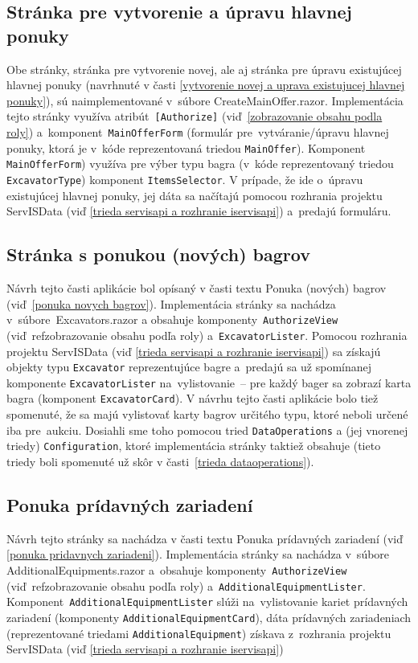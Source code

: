 \subsection{Stránka pre vytvorenie a úpravu hlavnej ponuky}

Obe stránky, stránka pre vytvorenie novej, ale aj stránka pre úpravu existujúcej hlavnej ponuky (navrhnuté v časti \ref{vytvorenie novej a uprava existujucej hlavnej ponuky}), sú naimplementované v~súbore CreateMainOffer.razor. Implementácia tejto stránky využíva atribút~\verb|[Authorize]| (viď~\ref{zobrazovanie obsahu podla roly}) a~komponent~\verb|MainOfferForm| (formulár pre~vytváranie/úpravu hlavnej ponuky, ktorá je v~kóde reprezentovaná triedou \verb|MainOffer|). Komponent \verb|MainOfferForm|) využíva pre výber typu bagra (v~kóde reprezentovaný triedou \verb|ExcavatorType|) komponent \verb|ItemsSelector|. V prípade, že ide o~úpravu existujúcej hlavnej ponuky, jej dáta sa načítajú pomocou rozhrania projektu ServISData (viď \ref{trieda servisapi a rozhranie iservisapi}) a~predajú formuláru.

\subsection{Stránka s ponukou (nových) bagrov}

Návrh tejto časti aplikácie bol opísaný v časti textu Ponuka (nových) bagrov (viď~\ref{ponuka novych bagrov}). Implementácia stránky sa nachádza v~súbore~Excavators.razor a obsahuje komponenty~\verb|AuthorizeView| (viď~ref{zobrazovanie obsahu podľa roly}) a~\verb|ExcavatorLister|. Pomocou rozhrania projektu ServISData (viď \ref{trieda servisapi a rozhranie iservisapi}) sa získajú objekty typu \verb|Excavator| reprezentujúce bagre a~predajú sa už spomínanej komponente \verb|ExcavatorLister| na~vylistovanie~-- pre každý bager sa zobrazí karta bagra (komponent \verb|ExcavatorCard|). V návrhu tejto časti aplikácie bolo tiež spomenuté, že sa majú vylistovať karty bagrov určitého typu, ktoré neboli určené iba pre~aukciu. Dosiahli sme toho pomocou tried \verb|DataOperations| a (jej vnorenej triedy) \verb|Configuration|, ktoré implementácia stránky taktiež obsahuje (tieto triedy boli spomenuté už skôr v časti~\ref{trieda dataoperations}).

\subsection{Ponuka prídavných zariadení}

Návrh tejto stránky sa nachádza v časti textu Ponuka prídavných zariadení (viď \ref{ponuka pridavnych zariadeni}). Implementácia stránky sa nachádza v~súbore AdditionalEquipments.razor a~obsahuje komponenty~\verb|AuthorizeView| (viď~ref{zobrazovanie obsahu podľa roly}) a~\verb|AdditionalEquipmentLister|. Komponent~\verb|AdditionalEquipmentLister| slúži na~vylistovanie kariet prídavných zariadení (komponenty \verb|AdditionalEquipmentCard|), dáta prídavných zariadeniach (reprezentované triedami \verb|AdditionalEquipment|) získava z~rozhrania projektu ServISData (viď \ref{trieda servisapi a rozhranie iservisapi})

